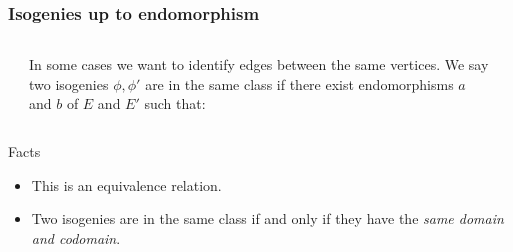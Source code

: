 \documentclass{beamer}
\begin{document}
\begin{frame}
  \frametitle{Isogenies up to endomorphism}

  \begin{columns}
    \begin{column}{0.2\textwidth}
      \begin{center}
      \end{center}
    \end{column}
    \begin{column}{0.6\textwidth}
      In some cases we want to identify edges between the same
      vertices. We say two \alert{isogenies} $\phi,\phi'$ are
      \alert{in the same class} if there exist endomorphisms $a$ and
      $b$ of $E$ and $E'$ such that:
    \end{column}
    \begin{column}{0.2\textwidth}
      \begin{center}
      \end{center}
    \end{column}
  \end{columns}

  \begin{block}{Facts}
    \begin{itemize}
    \item This is an equivalence relation.
    \item Two isogenies are in the same class \alert{if and only if}
      they have the \emph{same domain and codomain}.
    \end{itemize}
  \end{block}
\end{frame}
\end{document}
